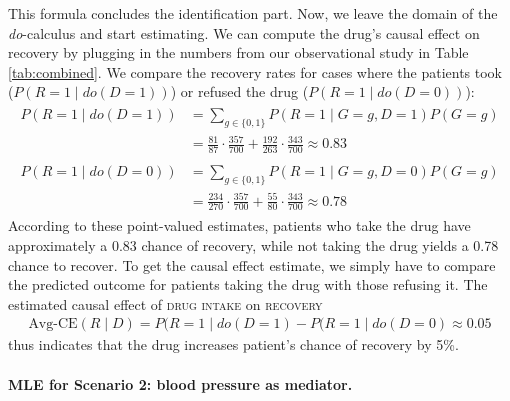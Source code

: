 \documentclass[nobib]{tufte-handout}
\newcommand{\docalc}{\emph{do}-calculus\xspace}
\newcommand{\mathdo}{\mathit{do}}
\begin{document}
This formula concludes the identification part.
Now, we leave the domain of the \docalc and start estimating.
We can compute the drug's causal effect on recovery by plugging in the numbers from our observational study in Table \ref{tab:combined}.
We compare the recovery rates for cases where the patients took ($P(R=1\mid \mathdo(D=1))$) or refused the drug ($P(R=1 \mid \mathdo(D=0))$):
\begin{align*}
\begin{split}
P(R=1\mid \mathdo(D=1))
&= \sum_{g\in \{0,1\}} P(R=1\mid G=g, D=1) P(G=g)\\
&= \frac{81}{87} \cdot \frac{357}{700} + \frac{192}{263} \cdot \frac{343}{700} \approx 0.83
\end{split}
\end{align*}
\begin{align*}
\begin{split}
P(R=1\mid \mathdo(D=0))
&= \sum_{g\in \{0,1\}} P(R=1\mid G=g, D=0) P(G=g)\\
&= \frac{234}{270} \cdot \frac{357}{700} + \frac{55}{80} \cdot \frac{343}{700} \approx 0.78
\end{split}
\end{align*}
According to these point-valued estimates, patients who take the drug have approximately a 0.83 chance of recovery, while not taking the drug yields a 0.78 chance to recover.
To get the causal effect estimate, we simply have to compare the predicted outcome for patients taking the drug with those refusing it.
The estimated causal effect of \textsc{drug intake} on \textsc{recovery} 
\begin{align*}
\text{Avg-CE}(R \mid D) = P(R=1\mid \mathdo(D=1)-P(R=1\mid \mathdo(D=0) \approx 0.05
\end{align*}
thus indicates that the drug increases patient's chance of recovery by 5\%.

\paragraph{MLE for Scenario 2: blood pressure as mediator.}
\end{document}
